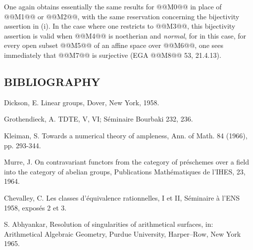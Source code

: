 One again obtains essentially the same results for @@M0@@ in place of @@M1@@ or @@M2@@, with the same reservation concerning the bijectivity assertion in (i). In the case where one restricts to @@M3@@, this bijectivity assertion is valid when @@M4@@ is noetherian and \emph{normal}, for in this case, for every open subset @@M5@@ of an affine space over @@M6@@, one sees immediately that @@M7@@ is surjective (EGA @@M8@@ 53, 21.4.13).

\subsection*{BIBLIOGRAPHY}
\begin{enumerate}[label={[\arabic*]}]
\item Dickson, E. Linear groups, Dover, New York, 1958.
\item Grothendieck, A. TDTE, V, VI; Séminaire Bourbaki 232, 236.
\item Kleiman, S. Towards a numerical theory of ampleness, Ann. of Math. 84 (1966), pp. 293-344.
\item Murre, J. On contravariant functors from the category of préschemes over a field into the category of abelian groups, Publications Mathématiques de l'IHES, 23, 1964.
\item Chevalley, C. Les classes d'équivalence rationnelles, I et II, Séminaire à l'ENS 1958, exposés 2 et 3.
\item S. Abhyankar, Resolution of singularities of arithmetical surfaces, in: Arithmetical Algebraic Geometry, Purdue University, Harper--Row, New York 1965.
\end{enumerate}

\providecommand{\Isom}{\operatorname{Isom}}
\providecommand{\Hom}{\operatorname{Hom}}
\providecommand{\Coker}{\operatorname{Coker}}
\providecommand{\Nil}{\operatorname{Nil}}
\providecommand{\im}{\operatorname{Im}}
\providecommand{\coker}{\operatorname{coker}}
\providecommand{\Supp}{\operatorname{Supp}}
\providecommand{\fppf}{\mathrm{fppf}}
\providecommand{\zar}{\mathrm{zar}}
\providecommand{\GL}{\operatorname{Gl}}
\providecommand{\Gr}{\operatorname{Gr}}
\providecommand{\Pic}{\operatorname{Pic}}
\providecommand{\Spec}{\operatorname{Spec}}
\providecommand{\V}{\operatorname{V}}
\providecommand{\Ass}{\operatorname{Ass}}

\providecommand{\Hom}{\operatorname{Hom}}
\providecommand{\Isom}{\operatorname{Isom}}
\providecommand{\Coker}{\operatorname{Coker}}
\providecommand{\Ass}{\operatorname{Ass}}
\providecommand{\sgacircled}[1]{\tikz[baseline=(char.base)]\node[shape=circle,draw,inner sep=.35pt](char){\mbox{\scriptsize #1}};}
\newpage
